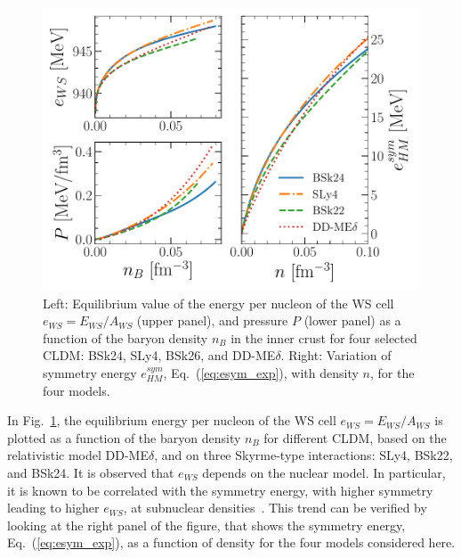 \begin{figure}[!t]
\begin{center}
  \includegraphics[width=0.9\linewidth]{figures/eos_icrust.pdf}
\end{center}
\caption[Energy per nucleon and pressure versus baryon density in the inner
crust, and symmetry energy at subsaturation densities]{Left: Equilibrium value 
  of the energy per nucleon of the WS cell $e_{WS} =
  E_{WS}/A_{WS}$ (upper panel), and pressure $P$ (lower panel) as a function of 
  the baryon 
density $n_B$ in the inner crust for four selected CLDM: BSk24, SLy4, BSk26,
and DD-ME$\delta$. Right: Variation of symmetry energy $e_{HM}^{sym}$,
Eq.~(\ref{eq:esym_exp}), with density $n$, for the four models.}\label{fig:eos_icrust}
\end{figure}

In Fig.~\ref{fig:eos_icrust}, the equilibrium energy
per nucleon of the WS cell $e_{WS} = E_{WS}/A_{WS}$ is plotted as a function of
the baryon density $n_B$ for different CLDM, based on the relativistic 
model DD-ME$\delta$, and on three Skyrme-type interactions: SLy4, BSk22, and
BSk24. It is observed that $e_{WS}$ depends on the nuclear model. In
particular, it is known to be correlated with the symmetry
energy, with higher symmetry leading to higher $e_{WS}$, at subnuclear
densities~\cite{Pearson2018}. This trend can be verified by looking at the
right panel of the figure, that shows the symmetry energy, 
{Eq.~(\ref{eq:esym_exp})}, as a function of density for the four models 
considered here.

